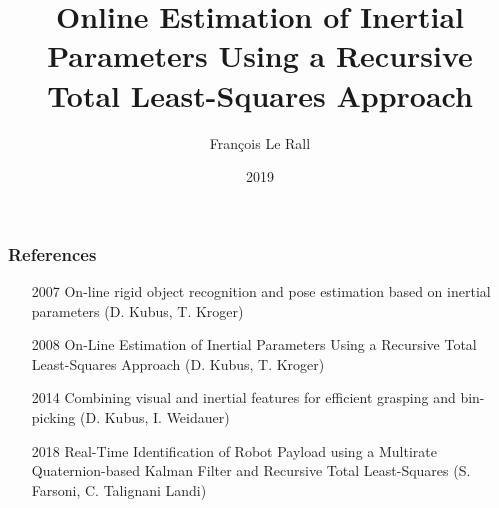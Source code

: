 \documentclass[usenames,dvipsnames]{beamer}
\title{Online Estimation of Inertial Parameters Using a Recursive Total Least-Squares Approach}
\author{François Le Rall}
\institute{Nomagic – Robotic Seminar}
\date{2019}
\begin{document}
\frame{\titlepage}

\begin{frame}
  \frametitle{References}

\begin{itemize}
  \item [2007] On-line rigid object recognition and pose estimation based on inertial parameters (D. Kubus, T. Kroger)
  \item [2008] On-Line Estimation of Inertial Parameters Using a Recursive Total Least-Squares Approach (D. Kubus, T. Kroger)
  \item [2014] Combining visual and inertial features for efficient grasping and bin-picking (D. Kubus, I. Weidauer)
  \item [2018] Real-Time Identification of Robot Payload using a Multirate Quaternion-based Kalman Filter and Recursive Total Least-Squares (S. Farsoni, C. Talignani Landi)

\end{itemize}
\end{frame}
\end{document}
